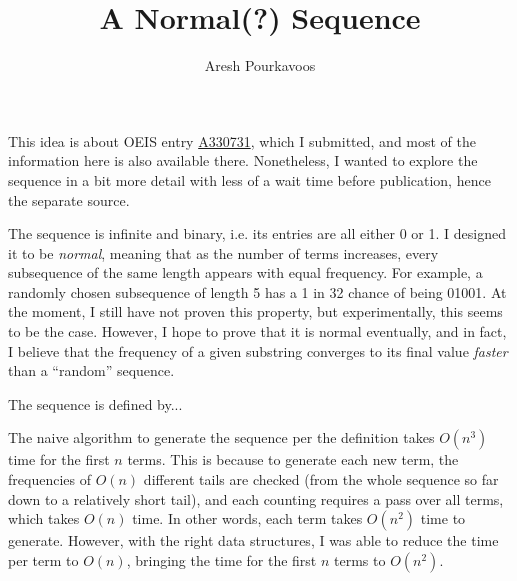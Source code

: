 \documentclass{article}
\begin{document}
\title{A Normal(?) Sequence}
\author{Aresh Pourkavoos}
\maketitle

This idea is about OEIS entry
\href{https://oeis.org/A330731}{A330731},
which I submitted,
and most of the information here
is also available there.
Nonetheless, I wanted to explore the sequence
in a bit more detail with less of a wait time before publication,
hence the separate source.

The sequence is infinite and binary,
i.e. its entries are all either 0 or 1.
I designed it to be \textit{normal},
meaning that as the number of terms increases,
every subsequence of the same length appears with equal frequency.
For example, a randomly chosen subsequence of length 5
has a 1 in 32 chance of being 01001.
At the moment, I still have not proven this property,
but experimentally, this seems to be the case.
However, I hope to prove that it is normal eventually,
and in fact, I believe that the frequency of a given substring
converges to its final value
\textit{faster} than a ``random'' sequence.

The sequence is defined by...

The naive algorithm to generate the sequence per the definition
takes $O(n^3)$ time for the first $n$ terms.
This is because to generate each new term,
the frequencies of $O(n)$ different tails are checked
(from the whole sequence so far down to a relatively short tail),
and each counting requires a pass over all terms,
which takes $O(n)$ time.
In other words, each term takes $O(n^2)$ time to generate.
However, with the right data structures,
I was able to reduce the time per term to $O(n)$,
bringing the time for the first $n$ terms to $O(n^2)$.
\end{document}
